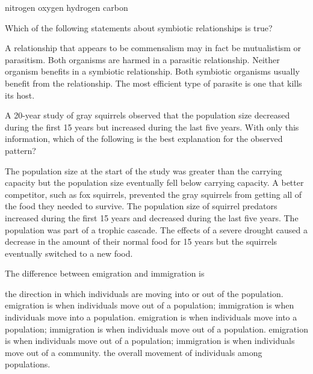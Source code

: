 \begin{choices}
\correctchoice nitrogen
\choice oxygen
\choice hydrogen
\choice carbon
\choice {}
\end{choices}

\question
Which of the following statements about symbiotic relationships is true?

\begin{choices}
\correctchoice A relationship that appears to be commensalism may in fact be mutualistism or parasitism.
\choice Both organisms are harmed in a parasitic relationship.
\choice Neither organism benefits in a symbiotic relationship.
\choice Both symbiotic organisms usually benefit from the relationship.
\choice The most efficient type of parasite is one that kills its host.
\end{choices}

%
\newpage
\question
A 20-year study of gray squirrels observed that the population size decreased during the first 15 years but increased during the last five years. With only this information, which of the following is the best explanation for the observed pattern?

\begin{choices}
\correctchoice The population size at the start of the study was greater than the carrying capacity but the population size eventually fell below carrying capacity. 
\choice A better competitor, such as fox squirrels, prevented the gray squirrels from getting all of the food they needed to survive.
\choice The population size of squirrel predators increased during the first 15 years and decreased during the last five years. 
\choice The population was part of a trophic cascade. 
\choice The effects of a severe drought caused a decrease in the amount of their normal food for 15 years but the squirrels eventually switched to a new food. 
\end{choices}

\question
The difference between emigration and immigration is

\begin{choices}
\choice the direction in which individuals are moving into or out of the population.
\correctchoice emigration is when individuals move out of a population; immigration is when individuals move into a population.
\choice emigration is when individuals move into a population; immigration is when individuals move out of a population.
\choice emigration is when individuals move out of a population; immigration is when individuals move out of a community.
\choice the overall movement of individuals among populations.
\end{choices}

